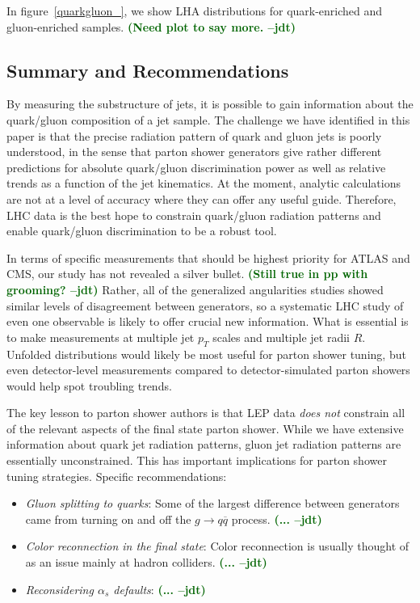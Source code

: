 \documentclass[11pt]{cernrep}
\newcommand{\jdt}[1]{\textbf{\textcolor{darkgreen}{(#1 --jdt)}}}
\begin{document}
In figure~\ref{quarkgluon_}, we show LHA distributions for quark-enriched and gluon-enriched samples.  \jdt{Need plot to say more.}

\subsection{Summary and Recommendations}
\label{quarkgluon_sec:conclude}

By measuring the substructure of jets, it is possible to gain information about the quark/gluon composition of a jet sample.  The challenge we have identified in this paper is that the precise radiation pattern of quark and gluon jets is poorly understood, in the sense that parton shower generators give rather different predictions for absolute quark/gluon discrimination power as well as relative trends as a function of the jet kinematics.  At the moment, analytic calculations are not at a level of accuracy where they can offer any useful guide.  Therefore, LHC data is the best hope to constrain quark/gluon radiation patterns and enable quark/gluon discrimination to be a robust tool.

In terms of specific measurements that should be highest priority for ATLAS and CMS, our study has not revealed a silver bullet.  \jdt{Still true in pp with grooming?}  Rather, all of the generalized angularities studies showed similar levels of disagreement between generators, so a systematic LHC study of even one observable is likely to offer crucial new information.  What is essential is to make measurements at multiple jet $p_T$ scales and multiple jet radii $R$.  Unfolded distributions would likely be most useful for parton shower tuning, but even detector-level measurements compared to detector-simulated parton showers would help spot troubling trends.

The key lesson to parton shower authors is that LEP data \emph{does not} constrain all of the relevant aspects of the final state parton shower.  While we have extensive information about quark jet radiation patterns, gluon jet radiation patterns are essentially unconstrained.  This has important implications for parton shower tuning strategies.  Specific recommendations:
\begin{itemize}
\item \textit{Gluon splitting to quarks}:  Some of the largest difference between generators came from turning on and off the $g \to q \overline{q}$ process.  \jdt{...}
\item \textit{Color reconnection in the final state}:  Color reconnection is usually thought of as an issue mainly at hadron colliders.  \jdt{...}
\item \textit{Reconsidering $\alpha_s$ defaults}:  \jdt{...}
\end{itemize}




\end{document}
